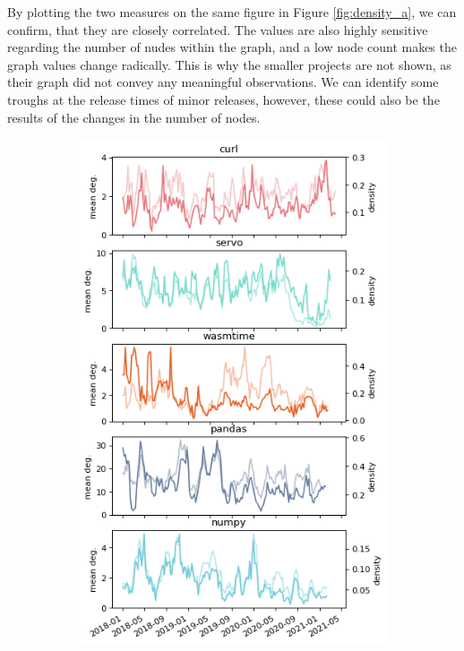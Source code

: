 By plotting the two measures on the same figure in Figure \ref{fig:density_a}, we can confirm, that they are closely correlated. The values are also highly sensitive regarding the number of nudes within the graph, and a low node count makes the graph values change radically. This is why the smaller projects are not shown, as their graph did not convey any meaningful observations. We can identify some troughs at the release times of minor releases, however, these could also be the results of the changes in the number of nodes.

\begin{figure}
    \centering
    \begin{subfigure}{0.53\textwidth}
        \centering
        \includegraphics[width=\textwidth]{figures/qualitative/mean_deg_density/mean_deg.png}

\end{subfigure}
\end{figure}
